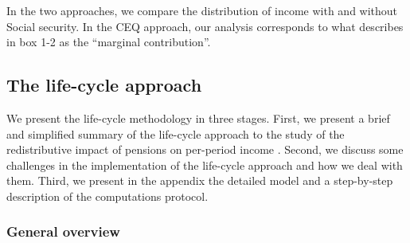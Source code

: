 \documentclass{article}
\begin{document}
In the two approaches, we compare the distribution of income with and without Social security. In the CEQ approach, our analysis corresponds to what \textcite{Lustig2022a} describes in box 1-2 as the ``marginal contribution''.

\subsection{The life-cycle approach}

We present the life-cycle methodology in three stages. First, we present a brief and simplified summary of the life-cycle approach to the study of the redistributive impact of pensions on per-period income \parencite[see][for a detailed presentation]{Forteza2023}. Second, we discuss some challenges in the implementation of the life-cycle approach and how we deal with them.  
Third, we present in the appendix the detailed model and a step-by-step description of the computations protocol. \begin{comment}
The set of STATA do files used to implement this methodology should be considered part of this paper, and is freely available in xxx (Github, otro?).
\end{comment}

\subsubsection{General overview}
\end{document}
